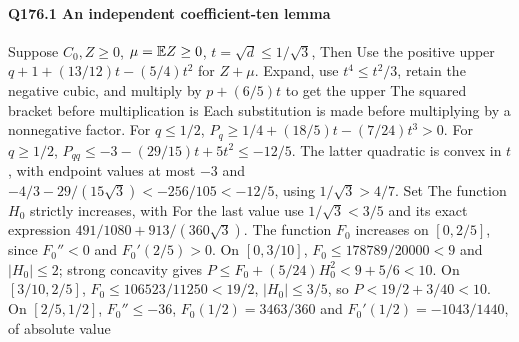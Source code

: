 \paragraph{Q176.1 An independent coefficient-ten lemma}\label{part:Q176.1}
Suppose $C_0,\allowbreak Z\ge\allowbreak 0$, $\mu=\allowbreak \mathbb E Z\ge\allowbreak 0$, $t=\allowbreak \sqrt d\le\allowbreak 1/\sqrt3$,
Then
Use the positive upper $q+1+(13/12)t-(5/4)t^2$ for $Z+\mu$.
Expand, use $t^4\le\allowbreak  t^2/3$, retain the negative cubic, and multiply by
$p+(6/5)t$ to get the upper
The squared bracket before multiplication is
Each substitution is made before multiplying by a nonnegative factor.
For $q\le\allowbreak 1/2$, $P_q\ge\allowbreak 1/4+(18/5)t-(7/24)t^3>\allowbreak 0$.
For $q\ge\allowbreak 1/2$,
$P_{qq}\le\allowbreak -3-(29/15)t+5t^2\le\allowbreak -12/5$.
The latter quadratic is convex in $t$, with endpoint values at most $-3$
and $-4/3-29/(15\sqrt3)<\allowbreak -256/105<\allowbreak -12/5$, using $1/\sqrt3>\allowbreak 4/7$.
Set
The function $H_0$ strictly increases, with
For the last value use $1/\sqrt3<\allowbreak 3/5$ and its exact expression
$491/1080+913/(360\sqrt3)$.
The function $F_0$ increases on $[0,\allowbreak 2/5]$, since $F_0''<\allowbreak 0$ and
$F_0'(2/5)>\allowbreak 0$.
On $[0,\allowbreak 3/10]$, $F_0\le\allowbreak 178789/20000<\allowbreak 9$ and $|H_0|\le\allowbreak 2$;
strong concavity gives $P\le\allowbreak  F_0+(5/24)H_0^2<\allowbreak 9+5/6<\allowbreak 10$.
On $[3/10,\allowbreak 2/5]$, $F_0\le\allowbreak 106523/11250<\allowbreak 19/2$, $|H_0|\le\allowbreak 3/5$,
so $P<\allowbreak 19/2+3/40<\allowbreak 10$.
On $[2/5,\allowbreak 1/2]$, $F_0''\le\allowbreak -36$,
$F_0(1/2)=\allowbreak 3463/360$ and $F_0'(1/2)=\allowbreak -1043/1440$, of absolute value
